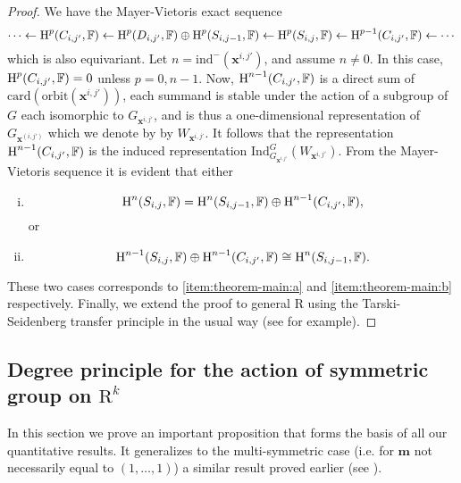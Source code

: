 \documentclass{amsart}
\theoremstyle{definition}
\theoremstyle{remark}
\numberwithin{equation}{section}
\begin{document}
\begin{proof}
 We have the Mayer-Vietoris exact sequence
 \[
 \cdots \leftarrow {\mbox{\rm H}}^p(C_{i,j'},{\mathbb{F}}) \leftarrow {\mbox{\rm H}}^p(D_{i,j'},{\mathbb{F}}) \oplus {\mbox{\rm H}}^p(S_{i,j-1},{\mathbb{F}}) \leftarrow {\mbox{\rm H}}^{p}(S_{i,j},{\mathbb{F}}) \leftarrow {\mbox{\rm H}}^{p-1}(C_{i,j'},{\mathbb{F}}) \leftarrow \cdots 
 \]
 which is also equivariant.
 Let $n = {\mathrm{ind}}^-({\mathbf{x}}^{i,j'})$, and assume $n \neq 0$.
 In this case, ${\mbox{\rm H}}^p(C_{i,j'},{\mathbb{F}})=0$ unless $p=0,n-1$. 
 Now, ${\mbox{\rm H}}^{n-1}(C_{i,j'},{\mathbb{F}})$ is a direct sum of ${\mathrm{card}}({\mathrm{orbit}}({\mathbf{x}}^{i,j'}))$, each summand
 is stable under the action of a 
 subgroup of $G$ each isomorphic to $G_{{\mathbf{x}}^{i,j'}}$, and is thus
 a one-dimensional representation  of $G_{{\mathbf{x}}^{(i,j')}}$ which we denote by
 by $W_{{\mathbf{x}}^{i,j'}}$. It follows that the representation ${\mbox{\rm H}}^{n-1}(C_{i,j'},{\mathbb{F}})$ is the induced representation ${\mathrm{Ind}}_{G_{{\mathbf{x}}^{i,j'}}}^{G}(W_{{\mathbf{x}}^{i,j'}})$.
 From the Mayer-Vietoris sequence it is evident that either
 \begin{enumerate}[(i)]
 \item
 \[
 {\mbox{\rm H}}^{n}(S_{i,j},{\mathbb{F}}) = {\mbox{\rm H}}^{n}(S_{i,j-1},{\mathbb{F}}) \oplus  {\mbox{\rm H}}^{n-1}(C_{i,j'},{\mathbb{F}}),
 \]
 or
 \item
 \[
 {\mbox{\rm H}}^{n-1}(S_{i,j},{\mathbb{F}}) \oplus {\mbox{\rm H}}^{n-1}(C_{i,j'},{\mathbb{F}}) \cong {\mbox{\rm H}}^{n}(S_{i,j-1},{\mathbb{F}}).
 \]
\end{enumerate}
 These two cases corresponds to \eqref{item:theorem-main:a} and \eqref{item:theorem-main:b}
 respectively.
 Finally, we extend the proof to general ${\mathrm{R}}$ using the Tarski-Seidenberg transfer principle in 
 the usual way (see \cite[Chapter 7]{BPRbook2} for example).
\end{proof}

\subsection{Degree principle for the action of symmetric group on ${\mathrm{R}}^k$}
\label{subsec:degree-principle}
In this section we prove an important proposition that forms the basis of all our quantitative results.
It generalizes to the multi-symmetric case (i.e. for ${\mathbf{m}}$ not necessarily equal to $(1,\ldots,1)$) 
a similar result proved earlier (see \cite{Riener,Timofte03,BC2013}).
\end{document}

